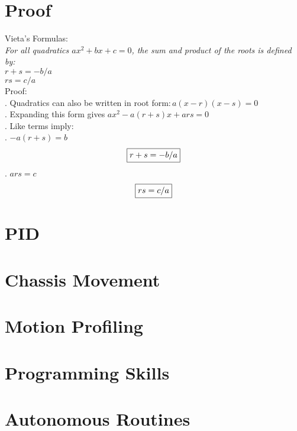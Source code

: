 \documentclass{article}
\begin{document}
\section{Proof}
Vieta's Formulas: \\
\indent \emph{For all quadratics $ax^2+bx+c=0$, the sum and product of the roots is defined by:}\\
\indent \indent $r+s=-b/a$\\
\indent \indent $rs=c/a$\\
\indent Proof: \\
\indent {}. Quadratics can also be written in root form:\,$a(x-r)(x-s)=0$\\
\indent {}. Expanding this form gives $ax^2-a(r+s)x+ars=0$\\
\indent {}. Like terms imply:\\
\indent \indent {}. $-a(r+s)=b$
\[\boxed{r+s=-b/a}\\\]
\indent \indent {}. $ars=c$
\[
\boxed{rs=c/a}\\
\]

\section{PID}


\section{Chassis Movement}


\section{Motion Profiling}


\section{Programming Skills}


\section{Autonomous Routines}
\end{document}
